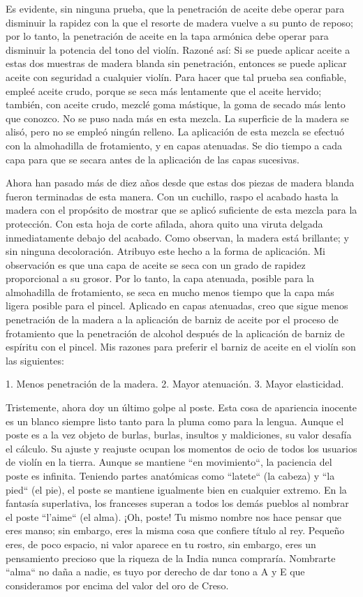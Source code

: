\documentclass[12pt]{book}
\begin{document}
Es evidente, sin ninguna prueba, que la penetración de aceite debe operar para disminuir la rapidez con la que el resorte de madera vuelve a su punto de reposo; por lo tanto, la penetración de aceite en la tapa armónica debe operar para disminuir la potencia del tono del violín. Razoné así: Si se puede aplicar aceite a estas dos muestras de madera blanda sin penetración, entonces se puede aplicar aceite con seguridad a cualquier violín. Para hacer que tal prueba sea confiable, empleé aceite crudo, porque se seca más lentamente que el aceite hervido; también, con aceite crudo, mezclé goma mástique, la goma de secado más lento que conozco. No se puso nada más en esta mezcla. La superficie de la madera se alisó, pero no se empleó ningún relleno. La aplicación de esta mezcla se efectuó con la almohadilla de frotamiento, y en capas atenuadas. Se dio tiempo a cada capa para que se secara antes de la aplicación de las capas sucesivas.

Ahora han pasado más de diez años desde que estas dos piezas de madera blanda fueron terminadas de esta manera. Con un cuchillo, raspo el acabado hasta la madera con el propósito de mostrar que se aplicó suficiente de esta mezcla para la protección. Con esta hoja de corte afilada, ahora quito una viruta delgada inmediatamente debajo del acabado. Como observan, la madera está brillante; y sin ninguna decoloración. Atribuyo este hecho a la forma de aplicación. Mi observación es que una capa de aceite se seca con un grado de rapidez proporcional a su grosor. Por lo tanto, la capa atenuada, posible para la almohadilla de frotamiento, se seca en mucho menos tiempo que la capa más ligera posible para el pincel. Aplicado en capas atenuadas, creo que sigue menos penetración de la madera a la aplicación de barniz de aceite por el proceso de frotamiento que la penetración de alcohol después de la aplicación de barniz de espíritu con el pincel. Mis razones para preferir el barniz de aceite en el violín son las siguientes:

1. Menos penetración de la madera.
2. Mayor atenuación.
3. Mayor elasticidad.

Tristemente, ahora doy un último golpe al poste. Esta cosa de apariencia inocente es un blanco siempre listo tanto para la pluma como para la lengua. Aunque el poste es a la vez objeto de burlas, burlas, insultos y maldiciones, su valor desafía el cálculo. Su ajuste y reajuste ocupan los momentos de ocio de todos los usuarios de violín en la tierra. Aunque se mantiene ``en movimiento``, la paciencia del poste es infinita. Teniendo partes anatómicas como ``latete`` (la cabeza) y ``la pied`` (el pie), el poste se mantiene igualmente bien en cualquier extremo. En la fantasía superlativa, los franceses superan a todos los demás pueblos al nombrar el poste ``l'aime`` (el alma).
¡Oh, poste! Tu mismo nombre nos hace pensar que eres manso; sin embargo, eres la misma cosa que confiere título al rey. Pequeño eres, de poco espacio, ni valor aparece en tu rostro, sin embargo, eres un pensamiento precioso que la riqueza de la India nunca compraría. Nombrarte ``alma`` no daña a nadie, es tuyo por derecho de dar tono a A y E que consideramos por encima del valor del oro de Creso.
\end{document}
